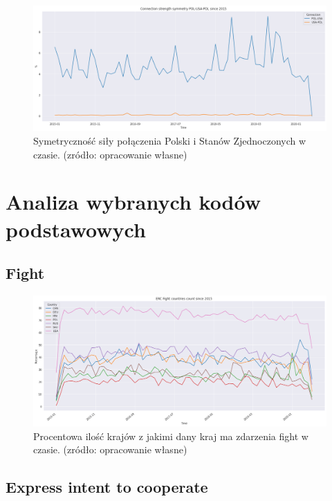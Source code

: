 \documentclass[11pt]{report}
\begin{document}
    \begin{figure}[ht]
        \centering
        \includegraphics[width=1 \textwidth]{fig/ConnectionSymmetry/POL-USA-POL.png}
        \caption{Symetryczność siły połączenia Polski i Stanów Zjednoczonych w czasie. (zródło: opracowanie własne)}
        \label{fig:POL-USA-POL}
    \end{figure}


    \section{Analiza wybranych kodów podstawowych}

    \subsection{Fight}


    \begin{figure}[ht]
        \centering
        \includegraphics[width=1 \textwidth]{fig/ERC/Fight.png}
        \caption{Procentowa ilość krajów z jakimi dany kraj ma zdarzenia fight w czasie. (zródło: opracowanie własne)}
        \label{fig:Fight}
    \end{figure}

    \subsection{Express intent to cooperate}
\end{document}
